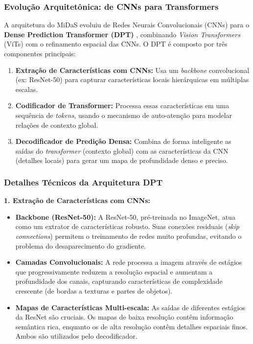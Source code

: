 \documentclass{SBCbookchapter}
\begin{document}
    \subsubsection{Evolução Arquitetônica: de CNNs para Transformers}
    A arquitetura do MiDaS evoluiu de Redes Neurais Convolucionais (CNNs) para o \textbf{Dense Prediction Transformer (DPT)} \cite{ranftl2021}, combinando \textit{Vision Transformers} (ViTs) com o refinamento espacial das CNNs. O DPT é composto por três componentes principais:
    \begin{enumerate}
        \item \textbf{Extração de Características com CNNs:} Usa um \textit{backbone} convolucional (ex: ResNet-50) para capturar características locais hierárquicas em múltiplas escalas.
        \item \textbf{Codificador de Transformer:} Processa essas características em uma sequência de \textit{tokens}, usando o mecanismo de auto-atenção para modelar relações de contexto global.
        \item \textbf{Decodificador de Predição Densa:} Combina de forma inteligente as saídas do \textit{transformer} (contexto global) com as características da CNN (detalhes locais) para gerar um mapa de profundidade denso e preciso.
    \end{enumerate}

    \subsubsection{Detalhes Técnicos da Arquitetura DPT}
    \textbf{1. Extração de Características com CNNs:}
    \begin{itemize}
        \item \textbf{Backbone (ResNet-50):} A ResNet-50, pré-treinada no ImageNet, atua como um extrator de características robusto. Suas conexões residuais (\textit{skip connections}) permitem o treinamento de redes muito profundas, evitando o problema do desaparecimento do gradiente.
        \item \textbf{Camadas Convolucionais:} A rede processa a imagem através de estágios que progressivamente reduzem a resolução espacial e aumentam a profundidade dos canais, capturando características de complexidade crescente (de bordas a texturas e partes de objetos).
        \item \textbf{Mapas de Características Multi-escala:} As saídas de diferentes estágios da ResNet são cruciais. Os mapas de baixa resolução contêm informação semântica rica, enquanto os de alta resolução contêm detalhes espaciais finos. Ambos são utilizados pelo decodificador.
    \end{itemize}
\end{document}
